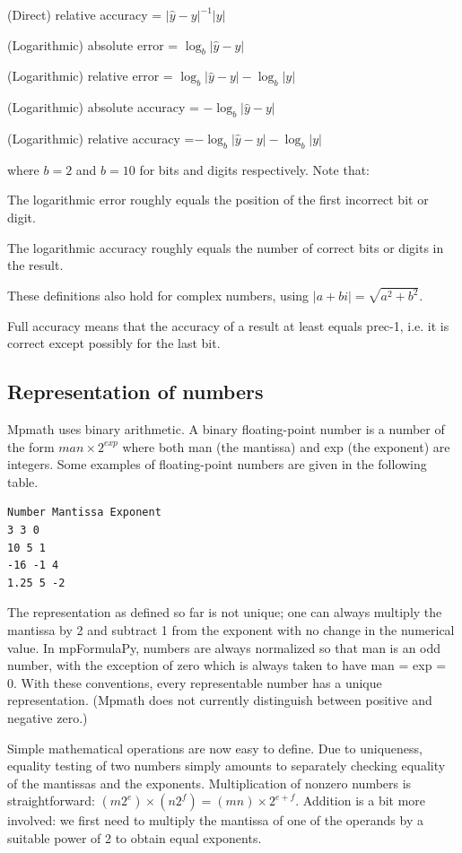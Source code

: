 (Direct) relative accuracy = $|\hat{y} - y|^{-1}|y|$

(Logarithmic) absolute error = $\log_b|\hat{y} - y|$

(Logarithmic) relative error = $\log_b|\hat{y} - y| - \log_b|y|$

(Logarithmic) absolute accuracy = $-\log_b|\hat{y} - y|$

(Logarithmic) relative accuracy =$-\log_b|\hat{y} - y| - \log_b|y|$

\vpara
where $b=2$ and $b=10$ for bits and digits respectively. Note that:

\vpara
The logarithmic error roughly equals the position of the first incorrect bit or digit.

The logarithmic accuracy roughly equals the number of correct bits or digits in the result.

\vpara
These definitions also hold for complex numbers, using $|a+bi|=\sqrt{a^2+b^2}$.

Full accuracy means that the accuracy of a result at least equals prec-1, i.e. it is correct except possibly for the last bit.




\subsection{Representation of numbers}

Mpmath uses binary arithmetic. A binary floating-point number is a number of the form $man \times 2^{exp}$ where both man (the mantissa) and exp (the exponent) are integers. Some examples of floating-point numbers are given in the following table.

\vpara
\begin{verbatim}
Number Mantissa Exponent
3 3 0
10 5 1
-16 -1 4
1.25 5 -2
\end{verbatim}


\vpara
The representation as defined so far is not unique; one can always multiply the mantissa by 2 and subtract 1 from the exponent with no change in the numerical value. In mpFormulaPy, numbers are always normalized so that man is an odd number, with the exception of zero
which is always taken to have man = exp = 0. With these conventions, every representable number has a unique representation. (Mpmath does not currently distinguish between positive and negative zero.)

\vpara
Simple mathematical operations are now easy to define. Due to uniqueness, equality testing of two numbers simply amounts to separately checking equality of the mantissas and the exponents. Multiplication of nonzero numbers is straightforward: $(m2^e) \times (n2^f) = (mn) \times 2^{e+f}$. Addition is a bit more involved: we first need to multiply the mantissa of one of the operands by a suitable power of 2 to obtain equal exponents.

